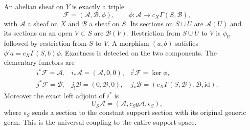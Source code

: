 \begin{theorem}
\label{FL:thm:finite-gluing}
An abelian sheaf on $Y$ is exactly a triple
\[
 \mathcal F=(\mathcal A,\mathcal B,\phi),\qquad
 \phi:\mathcal A\longrightarrow c_X\Gamma(S,\mathcal B),
 \tag{FL8}\label{FL:eq:triple}
\]
with $\mathcal A$ a sheaf on $X$ and $\mathcal B$ a sheaf on $S$.
Its sections on $S\cup U$ are $\mathcal A(U)$ and its sections on an
open $V\subset S$ are $\mathcal B(V)$. Restriction from $S\cup U$ to
$V$ is $\phi_U$ followed by restriction from $S$ to $V$.
A morphism $(a,b)$ satisfies
$\phi'a=c_X\Gamma(S,b)\phi$. Exactness is detected on the two
components. The elementary functors are
\[
\begin{array}{lll}
 i^*\mathcal F=\mathcal A,&i_*\mathcal A=(\mathcal A,0,0),&
 i^!\mathcal F=\ker\phi,\\
 j^*\mathcal F=\mathcal B,&j_!\mathcal B=(0,\mathcal B,0),&
 j_*\mathcal B=(c_X\Gamma(S,\mathcal B),\mathcal B,\mathrm{id}).
\end{array}
 \tag{FL9}\label{FL:eq:functors}
\]
Moreover the exact left adjoint of $i^*$ is
\[
 U_S\mathcal A=
 (\mathcal A,c_Sg\mathcal A,\epsilon_S),
 \tag{FL10}\label{FL:eq:universal}
\]
where $\epsilon_S$ sends a section to the constant support section
with its original generic germ. This is the universal coupling to
the entire support space.
\end{theorem}
